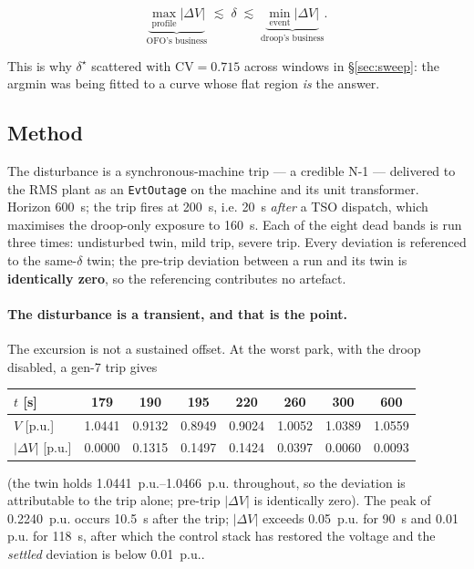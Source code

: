 \documentclass[11pt,a4paper]{article}
\newcommand{\pu}{\ensuremath{\mathrm{p.u.}}}
\newcommand{\dz}{\ensuremath{\delta}}
\begin{document}
\begin{equation}
  \underbrace{\max_{\text{profile}} |\Delta V|}_{\text{OFO's business}}
  \;\lesssim\; \dz \;\lesssim\;
  \underbrace{\min_{\text{event}} |\Delta V|}_{\text{droop's business}} .
  \label{eq:detector}
\end{equation}

This is why $\dz^\star$ scattered with $\mathrm{CV}=0.715$ across windows in
\S\ref{sec:sweep}: the argmin was being fitted to a curve whose flat region
\emph{is} the answer.

\subsection{Method}

The disturbance is a synchronous-machine trip --- a credible N-1 --- delivered to
the RMS plant as an \texttt{EvtOutage} on the machine and its unit transformer.
Horizon \SI{600}{\second}; the trip fires at \SI{200}{\second}, i.e.
\SI{20}{\second} \emph{after} a TSO dispatch, which maximises the droop-only
exposure to \SI{160}{\second}. Each of the eight dead bands is run three times:
undisturbed twin, mild trip, severe trip. Every deviation is referenced to the
same-$\dz$ twin; the pre-trip deviation between a run and its twin is
\textbf{identically zero}, so the referencing contributes no artefact.

\paragraph{The disturbance is a transient, and that is the point.} The excursion
is not a sustained offset. At the worst park, with the droop disabled, a gen-7
trip gives

\begin{center}
\begin{tabular}{lccccccc}
\toprule
$t$ [\si{\second}] & 179 & 190 & 195 & 220 & 260 & 300 & 600 \\
\midrule
$V$ [\pu]          & 1.0441 & 0.9132 & 0.8949 & 0.9024 & 1.0052 & 1.0389 & 1.0559 \\
$|\Delta V|$ [\pu] & 0.0000 & 0.1315 & 0.1497 & 0.1424 & 0.0397 & 0.0060 & 0.0093 \\
\bottomrule
\end{tabular}
\end{center}

\noindent (the twin holds \SIrange{1.0441}{1.0466}{\pu} throughout, so the
deviation is attributable to the trip alone; pre-trip $|\Delta V|$ is
identically zero). The peak of \SI{0.2240}{\pu} occurs \SI{10.5}{\second} after
the trip; $|\Delta V|$ exceeds \SI{0.05}{\pu} for \SI{90}{\second} and
\SI{0.01}{\pu} for \SI{118}{\second}, after which the control stack has restored
the voltage and the \emph{settled} deviation is below \SI{0.01}{\pu}.
\end{document}
